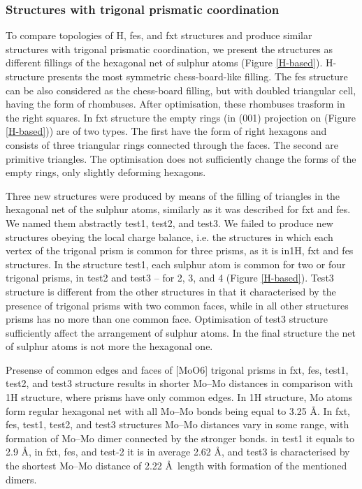 \documentclass[a4paperm]{article}
\begin{document}
\subsubsection{Structures with trigonal prismatic coordination}

To compare topologies of H, fes, and fxt structures and produce similar structures with trigonal prismatic coordination, we present the structures as different fillings of the hexagonal net of sulphur atoms (Figure \ref{H-based}).
H-structure presents the most symmetric chess-board-like filling.
The fes structure can be also considered as the chess-board filling, but with doubled triangular cell, having the form of rhombuses.
After optimisation, these rhombuses trasform in the right squares.
In fxt structure the empty rings (in (001) projection on  (Figure \ref{H-based})) are of two types.
The first have the form of right hexagons and consists of three triangular rings connected through the faces.
The second are primitive triangles.
The optimisation does not sufficiently change the forms of the empty rings, only slightly deforming hexagons.


Three new structures were produced by means of the filling of triangles in the hexagonal net of the sulphur atoms, similarly as it was described for fxt and fes.
We named them abstractly test1, test2, and test3.
We failed to produce new structures obeying the local charge balance, i.e. the structures in which each vertex of the trigonal prism is common for three prisms, as it is in1H, fxt and fes structures.
In the structure test1, each sulphur atom is common for two or four trigonal prisms, in test2 and test3 – for 2, 3, and 4 (Figure \ref{H-based}).
Test3 structure is different from the other structures in that it characterised by the presence of trigonal prisms with two common faces, while in all other structures prisms has no more than one common face.
Optimisation of test3 structure sufficiently affect the arrangement of sulphur atoms.
In the final structure the net of sulphur atoms is not more the hexagonal one.

Presense of common edges and faces of [MoO6] trigonal prisms in fxt, fes, test1, test2, and test3 structure results in shorter Mo--Mo distances in comparison with 1H structure, where prisms have only common edges.
In 1H structure, Mo atoms form regular hexagonal net with all Mo--Mo bonds being equal to 3.25 \AA.
In fxt, fes, test1, test2, and test3 structures Mo--Mo distances vary in some range, with formation of Mo--Mo dimer connected by the stronger bonds.
in test1 it equals to 2.9 \AA, in fxt, fes, and test-2 it is in average 2.62 \AA, and test3 is characterised by the shortest Mo--Mo distance of 2.22 \AA\ length with formation of the mentioned dimers.
\end{document}
